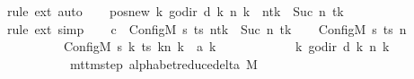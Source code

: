 \begin{isabellebody}
\ {\isacharparenleft}{\kern0pt}rule\ ext{\isacharparenright}{\kern0pt}\ auto\isanewline
\ \ \isamarkupfalse%
\ pos{\isacharunderscore}{\kern0pt}new{\isacharcolon}{\kern0pt}\ {\isachardoublequoteopen}{\isacharparenleft}{\kern0pt}{\isasymlambda}k{\isachardot}{\kern0pt}\ go{\isacharunderscore}{\kern0pt}dir\ {\isacharparenleft}{\kern0pt}{\isacharquery}{\kern0pt}d\ k{\isacharparenright}{\kern0pt}\ {\isacharparenleft}{\kern0pt}n\ k{\isacharparenright}{\kern0pt}{\isacharparenright}{\kern0pt}\ {\isacharequal}{\kern0pt}\ n{\isacharparenleft}{\kern0pt}tk\ {\isacharcolon}{\kern0pt}{\isacharequal}{\kern0pt}\ Suc\ {\isacharparenleft}{\kern0pt}n\ tk{\isacharparenright}{\kern0pt}{\isacharparenright}{\kern0pt}{\isachardoublequoteclose}\isanewline
\ \ \ \ \isamarkupfalse%
\ {\isacharparenleft}{\kern0pt}rule\ ext{\isacharparenright}{\kern0pt}\ simp\isanewline
\ \ \isamarkupfalse%
\ {\isacharquery}{\kern0pt}c{\isacharprime}{\kern0pt}{\isacharprime}{\kern0pt}\ {\isacharequal}{\kern0pt}\ {\isachardoublequoteopen}Config\isactrlsub M\ {\isacharquery}{\kern0pt}s{\isacharprime}{\kern0pt}\ ts\ {\isacharparenleft}{\kern0pt}n{\isacharparenleft}{\kern0pt}tk\ {\isacharcolon}{\kern0pt}{\isacharequal}{\kern0pt}\ Suc\ {\isacharparenleft}{\kern0pt}n\ tk{\isacharparenright}{\kern0pt}{\isacharparenright}{\kern0pt}{\isacharparenright}{\kern0pt}{\isachardoublequoteclose}\isanewline
\ \ \isamarkupfalse%
\ {\isachardoublequoteopen}{\isacharparenleft}{\kern0pt}Config\isactrlsub M\ {\isacharquery}{\kern0pt}s\ ts\ n{\isacharcomma}{\kern0pt}\isanewline
\ \ \ \ \ \ \ \ \ \ Config\isactrlsub M\ {\isacharquery}{\kern0pt}s{\isacharprime}{\kern0pt}\ {\isacharparenleft}{\kern0pt}{\isasymlambda}k{\isachardot}{\kern0pt}\ {\isacharparenleft}{\kern0pt}ts\ k{\isacharparenright}{\kern0pt}{\isacharparenleft}{\kern0pt}n\ k\ {\isacharcolon}{\kern0pt}{\isacharequal}{\kern0pt}\ {\isacharquery}{\kern0pt}a\ k{\isacharparenright}{\kern0pt}{\isacharparenright}{\kern0pt}\isanewline
\ \ \ \ \ \ \ \ \ \ \ \ {\isacharparenleft}{\kern0pt}{\isasymlambda}k{\isachardot}{\kern0pt}\ go{\isacharunderscore}{\kern0pt}dir\ {\isacharparenleft}{\kern0pt}{\isacharquery}{\kern0pt}d\ k{\isacharparenright}{\kern0pt}\ {\isacharparenleft}{\kern0pt}n\ k{\isacharparenright}{\kern0pt}{\isacharparenright}{\kern0pt}{\isacharparenright}{\kern0pt}\isanewline
\ \ \ \ \ \ \ \ \ \ {\isasymin}\ mttm{\isacharunderscore}{\kern0pt}step\ {\isacharparenleft}{\kern0pt}alphabet{\isacharunderscore}{\kern0pt}reduce{\isacharunderscore}{\kern0pt}delta\ M{\isacharparenright}{\kern0pt}{\isachardoublequoteclose}\isanewline

\end{isabellebody}
